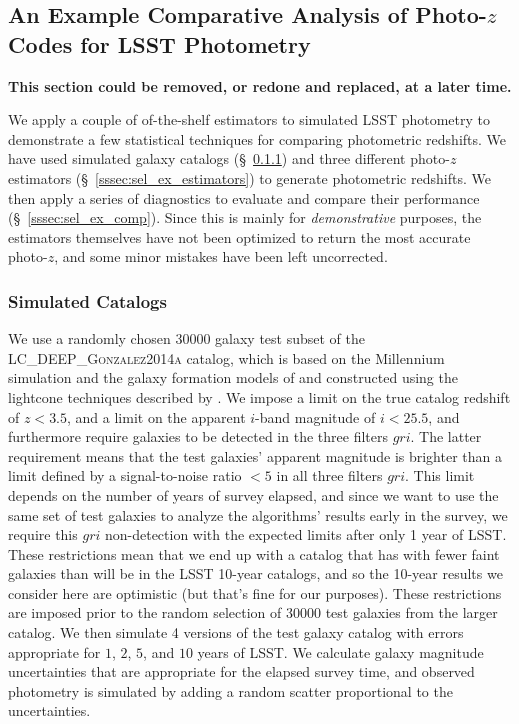 \documentclass[DM,lsstdraft,toc]{lsstdoc}
\begin{document}
\clearpage
\subsection{An Example Comparative Analysis of Photo-$z$ Codes for LSST Photometry}\label{ssec:sel_ex}

{\bf This section could be removed, or redone and replaced, at a later time.}

We apply a couple of of-the-shelf estimators to simulated LSST photometry to demonstrate a few statistical techniques for comparing photometric redshifts.
We have used simulated galaxy catalogs (\S~\ref{sssec:sel_ex_cats}) and three different photo-$z$ estimators (\S~\ref{sssec:sel_ex_estimators}) to generate photometric redshifts. 
We then apply a series of diagnostics to evaluate and compare their performance (\S~\ref{sssec:sel_ex_comp}).
Since this is mainly for {\it demonstrative} purposes, the estimators themselves have not been optimized to return the most accurate photo-$z$, and some minor mistakes have been left uncorrected.

\subsubsection{Simulated Catalogs}\label{sssec:sel_ex_cats}

We use a randomly chosen 30000 galaxy test subset of the \textsc{LC\_DEEP\_Gonzalez2014a} catalog, which is based on the Millennium simulation \citep{2005Natur.435..629S} and the galaxy formation models of \cite{2014MNRAS.439..264G} and constructed using the lightcone techniques described by \cite{2013MNRAS.429..556M}. We impose a limit on the true catalog redshift of $z<3.5$, and a limit on the apparent $i$-band magnitude of $i<25.5$, and furthermore require galaxies to be detected in the three filters $gri$. The latter requirement means that the test galaxies' apparent magnitude is brighter than a limit defined by a signal-to-noise ratio $<5$ in all three filters $gri$. This limit depends on the number of years of survey elapsed, and since we want to use the same set of test galaxies to analyze the algorithms' results early in the survey, we require this $gri$ non-detection with the expected limits after only 1 year of LSST. These restrictions mean that we end up with a catalog that has with fewer faint galaxies than will be in the LSST 10-year catalogs, and so the 10-year results we consider here are optimistic (but that's fine for our purposes). These restrictions are imposed prior to the random selection of 30000 test galaxies from the larger catalog. We then simulate 4 versions of the test galaxy catalog with errors appropriate for $1$, $2$, $5$, and $10$ years of LSST. We calculate galaxy magnitude uncertainties that are appropriate for the elapsed survey time, and observed photometry is simulated by adding a random scatter proportional to the uncertainties.
\end{document}
